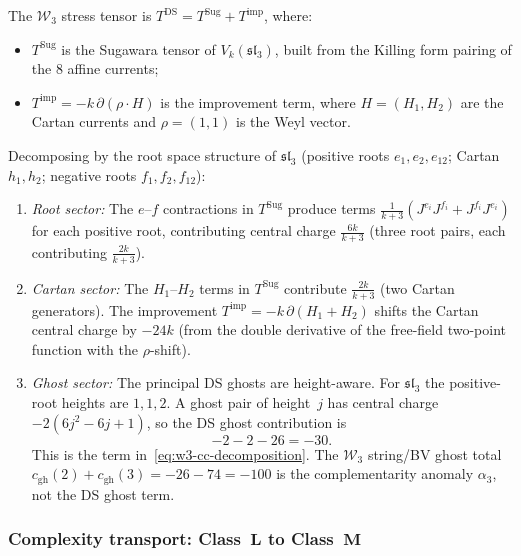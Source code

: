 \begin{computation}
\label{comp:w3-stress-tensor}
%
The $\mathcal{W}_3$ stress tensor is
$T^{\mathrm{DS}} = T^{\mathrm{Sug}} + T^{\mathrm{imp}}$,
where:
\begin{itemize}
\item $T^{\mathrm{Sug}}$ is the Sugawara tensor of
 $V_k(\mathfrak{sl}_3)$, built from the Killing form
 pairing of the $8$ affine currents;
\item $T^{\mathrm{imp}} = -k\,\partial(\rho \cdot H)$
 is the improvement term, where $H = (H_1, H_2)$ are
 the Cartan currents and $\rho = (1,1)$ is the Weyl
 vector.
\end{itemize}

Decomposing by the root space structure of
$\mathfrak{sl}_3$ (positive roots $e_1, e_2, e_{12}$;
Cartan $h_1, h_2$; negative roots $f_1, f_2, f_{12}$):
\begin{enumerate}[label=\textup{(\roman*)}]
\item \emph{Root sector:} The $e$--$f$ contractions in
 $T^{\mathrm{Sug}}$ produce terms
 $\frac{1}{k+3}(J^{e_i} J^{f_i} + J^{f_i} J^{e_i})$
 for each positive root, contributing central charge
 $\frac{6k}{k+3}$ (three root pairs, each contributing
 $\frac{2k}{k+3}$).
\item \emph{Cartan sector:} The $H_1$--$H_2$ terms in
 $T^{\mathrm{Sug}}$ contribute $\frac{2k}{k+3}$
 (two Cartan generators). The improvement
 $T^{\mathrm{imp}} = -k\,\partial(H_1 + H_2)$ shifts
 the Cartan central charge by $-24k$ (from the double
 derivative of the free-field two-point function
 with the $\rho$-shift).
\item \emph{Ghost sector:} The principal DS ghosts are height-aware.
 For $\mathfrak{sl}_3$ the positive-root heights are $1,1,2$.
 A ghost pair of height~$j$ has central charge
 $-2(6j^2-6j+1)$, so the DS ghost contribution is
 \[
 -2-2-26=-30.
 \]
 This is the term in~\eqref{eq:w3-cc-decomposition}. The
 $\mathcal W_3$ string/BV ghost total
 $c_{\mathrm{gh}}(2)+c_{\mathrm{gh}}(3)=-26-74=-100$
 is the complementarity anomaly $\alpha_3$, not the DS ghost term.
\end{enumerate}
\end{computation}

\subsubsection{Complexity transport:
Class~$\mathbf{L}$ to Class~$\mathbf{M}$}

